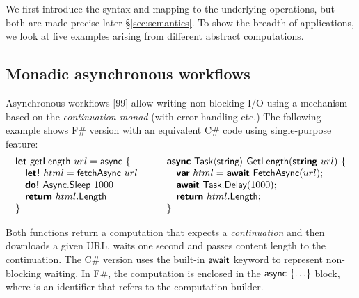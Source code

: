 \documentclass[runningheads,a4paper]{llncs}
\begin{document}
We first introduce the syntax and mapping to the underlying operations, but both are made precise 
later \S\ref{sec:semantics}. To show the breadth of applications, we look at five examples arising 
from different abstract computations.


\subsection{Monadic asynchronous workflows}
\label{sec:intro-async}

Asynchronous workflows [99] allow writing non-blocking I/O using a mechanism based on the 
\emph{continuation monad} (with error handling etc.) The following example shows F\# version
with an equivalent C\# code using single-purpose feature:
%
\begin{equation*}
\begin{array}{l}
\kvd{let}~\ident{getLength}~url=\ident{async}~\{\\
\quad \kvd{let!}~html = \ident{fetchAsync}~url\\
\quad \kvd{do!}~\ident{Async}.\ident{Sleep}~1000\\
\quad \kvd{return}~html.\ident{Length}\\
\}
\end{array}\qquad
\begin{array}{l}
\kvd{async}~\ident{Task}\langle\ident{string}\rangle~\ident{GetLength}(\kvd{string}~url)~\{\\
\quad \kvd{var}~html = \kvd{await}~\ident{FetchAsync}(url);\\
\quad \kvd{await}~\ident{Task}.\ident{Delay}(1000);\\
\quad \kvd{return}~html.\ident{Length};\\
\}
\end{array}
\end{equation*}

Both functions return a computation that expects a \emph{continuation} and then downloads a given 
URL, waits one second and passes content length to the continuation. The C\# version uses the built-in
$\textnormal{\sffamily await}$ keyword to represent non-blocking waiting. In F\#, the computation is enclosed
in the $\textnormal{\sffamily async}~\{ \ldots \}$ block, where  is an identifier that refers to
the computation builder. 
\end{document}
